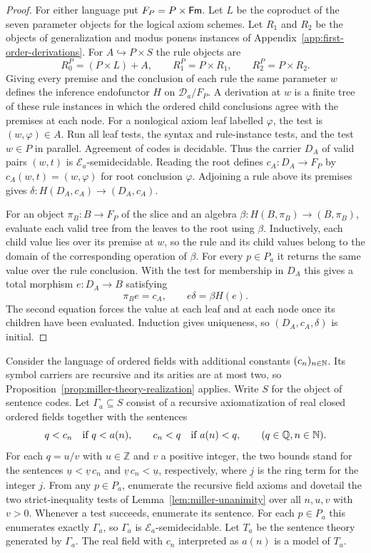 \begin{proof}
For either language put $F_P=P\times\mathsf{Fm}$. Let $L$ be the coproduct of the seven parameter objects for the logical
axiom schemes. Let $R_1$ and $R_2$ be the objects of generalization and
modus ponens instances of Appendix~\ref{app:first-order-derivations}. For
$A\hookrightarrow P\times S$ the rule objects are
\[
 R_0^P=(P\times L)+A,\qquad R_1^P=P\times R_1,\qquad
 R_2^P=P\times R_2.
\]
Giving every premise and the conclusion of each rule the same parameter
$w$ defines the inference endofunctor $H$ on $\mathcal D_a/F_P$. A derivation at $w$ is
a finite tree of these rule instances in which the ordered child
conclusions agree with the premises at each node.
For a nonlogical axiom leaf labelled $\varphi$, the test is
$(w,\varphi)\in A$. Run all leaf tests, the syntax and rule-instance
tests, and the test $w\in P$ in parallel. Agreement of codes is
decidable. Thus the carrier $D_A$ of valid pairs $(w,t)$ is
$\mathcal E_a$-semidecidable. Reading the root defines
$c_A:D_A\to F_P$ by $c_A(w,t)=(w,\varphi)$ for root conclusion
$\varphi$. Adjoining a rule above its premises gives
$\delta:H(D_A,c_A)\to(D_A,c_A)$.

For an object $\pi_B:B\to F_P$ of the slice and an algebra
$\beta:H(B,\pi_B)\to(B,\pi_B)$, evaluate each
valid tree from the leaves to the root using $\beta$. Inductively,
each child value lies over its premise at $w$, so the rule and its
child values belong to the domain of the corresponding operation of
$\beta$. For every $p\in P_a$ it returns the same value over the rule
conclusion. With the test for membership in $D_A$
this gives a total morphism $e:D_A\to B$ satisfying
\[
 \pi_B e=c_A,\qquad e\delta=\beta H(e).
\]
The second equation forces the value at each leaf and at each node
once its children have been evaluated. Induction gives uniqueness,
so $(D_A,c_A,\delta)$ is initial.
\end{proof}

Consider the language of ordered fields with additional constants
$(c_n)_{n\in\mathbb N}$. Its symbol carriers are recursive and its arities
are at most two, so Proposition~\ref{prop:miller-theory-realization}
applies. Write $S$ for the object of sentence codes. Let
$\Gamma_a\subseteq S$ consist of a recursive axiomatization of
real closed ordered fields together with the sentences
\begin{equation}\label{eq:miller-theory}
 q<c_n\quad\text{if }q<a(n),\qquad
 c_n<q\quad\text{if }a(n)<q,
 \qquad(q\in\mathbb Q, n\in\mathbb N).
\end{equation}
For each $q=u/v$ with $u\in\mathbb Z$ and $v$ a positive integer,
the two bounds stand for the sentences
$\underline{u}<\underline{v}\,c_n$ and
$\underline{v}\,c_n<\underline{u}$, respectively, where $\underline{j}$
is the ring term for the integer $j$.
From any $p\in P_a$, enumerate the recursive field axioms and
dovetail the two strict-inequality tests of
Lemma~\ref{lem:miller-unanimity} over all $n,u,v$ with $v>0$.
Whenever a test succeeds, enumerate its sentence. For each $p\in P_a$
this enumerates exactly $\Gamma_a$, so $\Gamma_a$ is
$\mathcal E_a$-semidecidable. Let $T_a$ be the sentence theory
generated by $\Gamma_a$. The real field with $c_n$ interpreted as $a(n)$
is a model of $T_a$.

